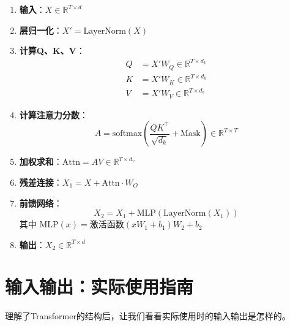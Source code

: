 \begin{enumerate}
    \item \textbf{输入}：$X \in \mathbb{R}^{T \times d}$
    
    \item \textbf{层归一化}：$X' = \text{LayerNorm}(X)$
    
    \item \textbf{计算Q、K、V}：
    \begin{align}
        Q &= X' W_Q \in \mathbb{R}^{T \times d_k} \\
        K &= X' W_K \in \mathbb{R}^{T \times d_k} \\
        V &= X' W_V \in \mathbb{R}^{T \times d_v}
    \end{align}
    
    \item \textbf{计算注意力分数}：
    \begin{equation}
        A = \text{softmax}\left(\frac{QK^\top}{\sqrt{d_k}} + \text{Mask}\right) \in \mathbb{R}^{T \times T}
    \end{equation}
    
    \item \textbf{加权求和}：$\text{Attn} = AV \in \mathbb{R}^{T \times d_v}$
    
    \item \textbf{残差连接}：$X_1 = X + \text{Attn} \cdot W_O$
    
    \item \textbf{前馈网络}：
    \begin{equation}
        X_2 = X_1 + \text{MLP}(\text{LayerNorm}(X_1))
    \end{equation}
    其中 $\text{MLP}(x) = \text{激活函数}(xW_1 + b_1)W_2 + b_2$
    
    \item \textbf{输出}：$X_2 \in \mathbb{R}^{T \times d}$
\end{enumerate}

\section{输入输出：实际使用指南}

理解了Transformer的结构后，让我们看看实际使用时的输入输出是怎样的。

